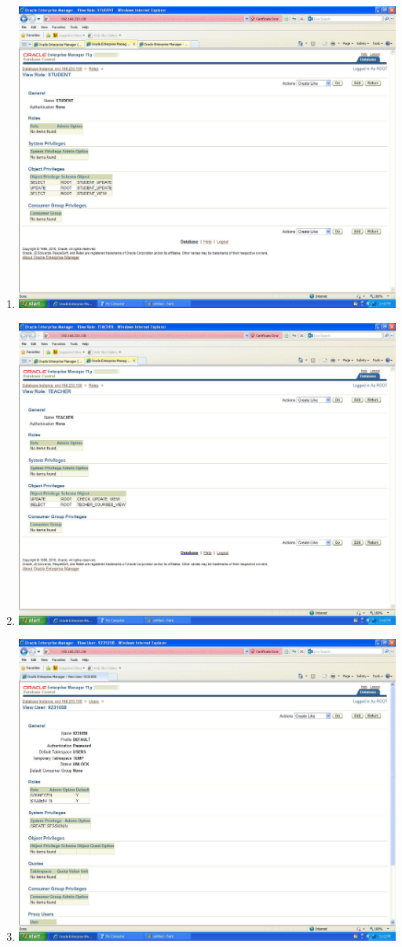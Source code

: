 \documentclass{article}
\begin{document}
\begin{enumerate}
	\item
		\includegraphics[scale=0.4]{figs/12.JPG}
	\item
		\includegraphics[scale=0.4]{figs/13.JPG}
	\item
		\includegraphics[scale=0.4]{figs/14.JPG}

\end{enumerate}
\end{document}

